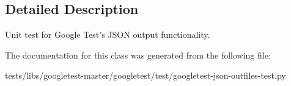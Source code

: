 \subsection{Detailed Description}
\begin{DoxyVerb}Unit test for Google Test's JSON output functionality.\end{DoxyVerb}
 

The documentation for this class was generated from the following file\+:\begin{DoxyCompactItemize}
\item 
tests/libs/googletest-\/master/googletest/test/googletest-\/json-\/outfiles-\/test.\+py\end{DoxyCompactItemize}

